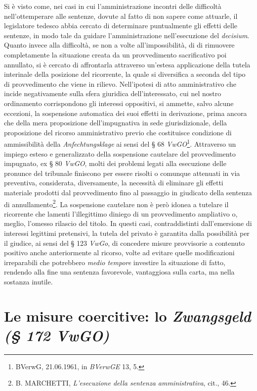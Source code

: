 \documentclass[12pt,it,a4paper,]{report}
\begin{document}
Si è visto come, nei casi in cui l'amministrazione incontri delle
difficoltà nell'ottemperare alle sentenze, dovute al fatto di non sapere
come attuarle, il legislatore tedesco abbia cercato di determinare
puntualmente gli effetti delle sentenze, in modo tale da guidare
l'amministrazione nell'esecuzione del \emph{decisium}. Quanto invece
alla difficoltà, se non a volte all'impossibilità, di di rimuovere
completamente la situazione creata da un provvedimento sacrificativo poi
annullato, si è cercato di affrontarla attraverso un'estesa applicazione
della tutela interinale della posizione del ricorrente, la quale si
diversifica a seconda del tipo di provvedimento che viene in rilievo.
Nell'ipotesi di atto amministrativo che incide negativamente sulla sfera
giuridica dell'interessato, cui nel nostro ordinamento corrispondono gli
interessi oppositivi, si ammette, salvo alcune eccezioni, la sospensione
automatica dei suoi effetti in derivazione, prima ancora che della mera
proposizione dell'impugnativa in sede giurisdizionale, della
proposizione del ricorso amministrativo previo che costituisce
condizione di ammissibilità della \emph{Anfechtungsklage} ai sensi del §
68 \emph{VwGO}\footnote{BVerwG, 21.06.1961, in \emph{BVerwGE} 13, 5.}.
Attraverso un impiego esteso e generalizzato della sospensione cautelare
del provvedimento impugnato, ex § 80 \emph{VwGO}, molti dei problemi
legati alla esecuzione delle pronunce del tribunale finiscono per essere
risolti o comunque attenuati in via preventiva, considerata,
diversamente, la necessità di eliminare gli effetti materiale prodotti
dal provvedimento fino al passaggio in giudicato della sentenza di
annullamento\footnote{B. MARCHETTI, \emph{L'esecuzione della sentenza
  amministrativa}, cit., 46.}. La sospensione cautelare non è però
idonea a tutelare il ricorrente che lamenti l'illegittimo diniego di un
provvedimento ampliativo o, meglio, l'omesso rilascio del titolo. In
questi casi, contraddistinti dall'emersione di interessi legittimi
pretensivi, la tutela del privato è garantita dalla possibilità per il
giudice, ai sensi del § 123 \emph{VwGo}, di concedere misure provvisorie
a contenuto positivo anche anteriormente al ricorso, volte ad evitare
quelle modificazioni irreparabili che potrebbero \emph{medio tempore}
investire la situazione di fatto, rendendo alla fine una sentenza
favorevole, vantaggiosa sulla carta, ma nella sostanza inutile.

\hypertarget{le-misure-coercitive-lo-zwangsgeld-172-vwgo}{%
\section{\texorpdfstring{Le misure coercitive: lo \emph{Zwangsgeld (§
172
VwGO)}}{Le misure coercitive: lo Zwangsgeld (§ 172 VwGO)}}\label{le-misure-coercitive-lo-zwangsgeld-172-vwgo}}
\end{document}
